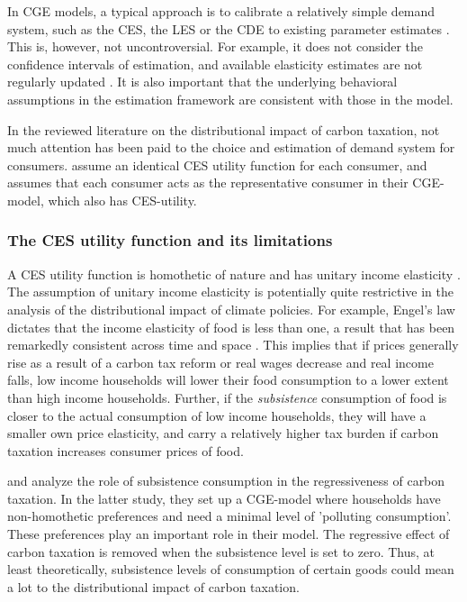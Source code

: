 In CGE models, a typical approach is to calibrate a relatively simple demand system, such as the CES, the LES or the CDE to existing parameter estimates \citep{shojaeddiniconsumer}. This is, however, not uncontroversial. For example, it does not consider the confidence intervals of estimation, and available elasticity estimates are not regularly updated \citep{hertel2007confident}. It is also important that the underlying behavioral assumptions in the estimation framework are consistent with those in the model.

In the reviewed literature on the distributional impact of carbon taxation, not much attention has been paid to the choice and estimation of demand system for consumers. \cite{dmoer2009} assume an identical CES utility function for each consumer, and \cite{Kraka2020} assumes that each consumer acts as the representative consumer in their CGE-model, which also has CES-utility.

\subsubsection{The CES utility function and its limitations}
A CES utility function is homothetic of nature and has unitary income elasticity \citep{annabi2006functional}. The assumption of unitary income elasticity is potentially quite restrictive in the analysis of the distributional impact of climate policies. For example, Engel's law dictates that the income elasticity of food is less than one, a result that has been remarkedly consistent across time and space \citep{kaus2013beyond}. This implies that if prices generally rise as a result of a carbon tax reform or real wages decrease and real income falls, low income households will lower their food consumption to a lower extent than high income households. Further, if the \textit{subsistence} consumption of food is closer to the actual consumption of low income households, they will have a smaller own price elasticity, and carry a relatively higher tax burden if carbon taxation increases consumer prices of food.

\cite{KlenertMattauch2016} and \cite{klenert2018} analyze the role of subsistence consumption in the regressiveness of carbon taxation. In the latter study, they set up a CGE-model where households have non-homothetic preferences and need a minimal level of 'polluting consumption'. These preferences play an important role in their model. The regressive effect of carbon taxation is removed when the subsistence level is set to zero. Thus, at least theoretically, subsistence levels of consumption of certain goods could mean a lot to the distributional impact of carbon taxation. 

